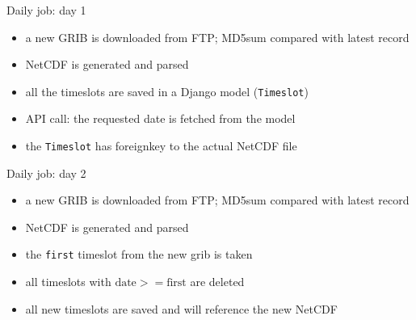 \documentclass[xcolor=svgnames]{beamer}
\begin{document}
    \begin{frame}{Daily job: day 1}
        \begin{itemize}
            \item a new GRIB is downloaded from FTP; MD5sum compared with latest record
            \item NetCDF is generated and parsed
            \item all the timeslots are saved in a Django model (\texttt{Timeslot})
            \item API call: the requested date is fetched from the model
            \item the \texttt{Timeslot} has foreignkey to the actual NetCDF file
        \end{itemize}
        \vspace{0.05\textwidth}
        \startchronology[startyear=0,stopyear=84]
        \stopchronology
    \end{frame}

    \begin{frame}{Daily job: day 2}
        \begin{itemize}
            \item a new GRIB is downloaded from FTP; MD5sum compared with latest record
            \item NetCDF is generated and parsed
            \item the \texttt{first} timeslot from the new grib is taken
            \item all timeslots with $\text{date}>=\text{first}$ are deleted
            \item all new timeslots are saved and will reference the new NetCDF
        \end{itemize}
        \vspace{0.05\textwidth}
        \startchronology[startyear=0,stopyear=84]
        \stopchronology
    \end{frame}
\end{document}
